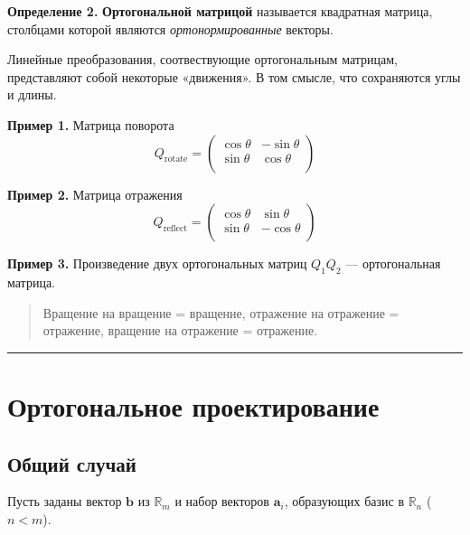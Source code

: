 \documentclass[11pt,a4paper]{article}
\renewcommand{\linethickness}{0.1ex}
\begin{document}
\textbf{Определение 2.} \textbf{Ортогональной матрицой} называется
квадратная матрица, столбцами которой являются \emph{ортонормированные}
векторы.

Линейные преобразования, соотвествующие ортогональным матрицам,
представляют собой некоторые «движения». В том смысле, что сохраняются
углы и длины.

\textbf{Пример 1.} Матрица поворота \[
  Q_\mathrm{rotate} = 
  \begin{pmatrix}
     \cos\theta & -\sin\theta \\
     \sin\theta &  \cos\theta \\
  \end{pmatrix}
\]

\textbf{Пример 2.} Матрица отражения \[
  Q_\mathrm{reflect} = 
  \begin{pmatrix}
     \cos\theta &  \sin\theta \\
     \sin\theta & -\cos\theta \\
  \end{pmatrix}
\]

\textbf{Пример 3.} Произведение двух ортогональных матриц \(Q_1 Q_2\)
--- ортогональная матрица.

\begin{quote}
Вращение на вращение = вращение, отражение на отражение = отражение,
вращение на отражение = отражение.
\end{quote}

    \begin{center}\rule{0.5\linewidth}{\linethickness}\end{center}

    \hypertarget{ux43eux440ux442ux43eux433ux43eux43dux430ux43bux44cux43dux43eux435-ux43fux440ux43eux435ux43aux442ux438ux440ux43eux432ux430ux43dux438ux435}{%
\section{Ортогональное
проектирование}\label{ux43eux440ux442ux43eux433ux43eux43dux430ux43bux44cux43dux43eux435-ux43fux440ux43eux435ux43aux442ux438ux440ux43eux432ux430ux43dux438ux435}}

\hypertarget{ux43eux431ux449ux438ux439-ux441ux43bux443ux447ux430ux439}{%
\subsection{Общий
случай}\label{ux43eux431ux449ux438ux439-ux441ux43bux443ux447ux430ux439}}

Пусть заданы вектор \(\mathbf{b}\) из \(\mathbb{R}_m\) и набор векторов
\(\mathbf{a}_i\), образующих базис в \(\mathbb{R}_n\) (\(n<m\)).
\end{document}
